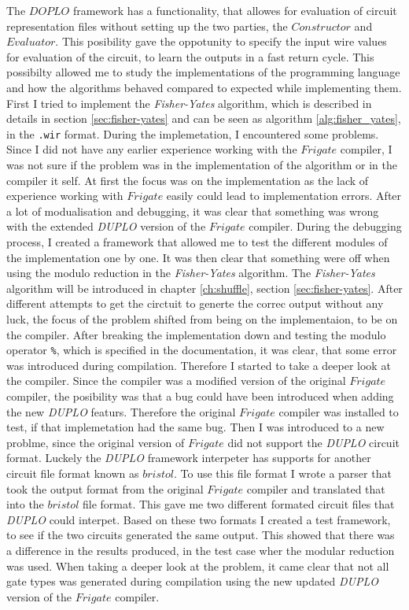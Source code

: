 \documentclass[twoside,11pt,openright]{report}
\newcommand{\FY}{\textit{Fisher-Yates} }
\newcommand{\DUPLO}{\textit{DUPLO} }
\begin{document}
The $DOPLO$ framework has a functionality, that allowes for evaluation of circuit representation files without setting up the two parties, the $Constructor$ and $Evaluator$. This posibility gave the oppotunity to specify the input wire values for evaluation of the circuit, to learn the outputs in a fast return cycle. This possibilty allowed me to study the implementations of the programming language and how the algorithms behaved compared to expected while implementing them. First I tried to implement the \FY algorithm, which is described in details in section \ref{sec:fisher-yates} and can be seen as algorithm \ref{alg:fisher_yates}, in the \verb|.wir| format. During the implemetation, I encountered some problems. Since I did not have any earlier experience working with the $Frigate$ compiler, I was not sure if the problem was in the implementation of the algorithm or in the compiler it self. At first the focus was on the implementation as the lack of experience working with $Frigate$ easily could lead to implementation errors. After a lot of modualisation and debugging, it was clear that something was wrong with the extended \DUPLO version of the $Frigate$ compiler. During the debugging process, I created a framework that allowed me to test the different modules of the implementation one by one. It was then clear that something were off when using the modulo reduction in the \FY algorithm. The \FY algorithm will be introduced in chapter \ref{ch:shuffle}, section \ref{sec:fisher-yates}. After different attempts to get the circtuit to generte the correc output without any luck, the focus of the problem shifted from being on the implementaion, to be on the compiler. After breaking the implementation down and testing the modulo operator \verb|%|, which is specified in the documentation, it was clear, that some error was introduced during compilation. Therefore I started to take a deeper look at the compiler. Since the compiler was a modified version of the original $Frigate$ compiler, the posibility was that a bug could have been introduced when adding the new \DUPLO featurs. Therefore the original $Frigate$ compiler was installed to test, if that implemetation had the same bug. Then I was introduced to a new problme, since the original version of $Frigate$ did not support the \DUPLO circuit format. Luckely the \DUPLO framework interpeter has supports for another circuit file format known as $bristol$. To use this file format I wrote a parser that took the output format from the original $Frigate$ compiler and translated that into the $bristol$ file format. This gave me two different formated circuit files that \DUPLO could interpet. Based on these two formats I created a test framework, to see if the two circuits generated the same output. This showed that there was a difference in the results produced, in the test case wher the modular reduction was used. When taking a deeper look at the problem, it came clear that not all gate types was generated during compilation using the new updated \DUPLO version of the $Frigate$ compiler.
\end{document}
